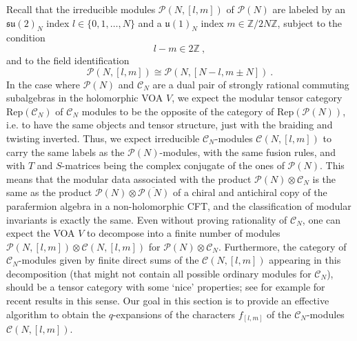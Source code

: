 \documentclass[11pt,reqno]{article}
\newcommand{\be}{\begin{equation}}
\newcommand{\ee}{\end{equation}}
\newcommand{\calC}{\mathcal{C}}
\newcommand{\ZZ}{\mathbb{Z}}
\newcommand{\paraf}{\mathcal{P}}
\newcommand{\alg}[1]{\mathfrak{#1}}
\begin{document}
Recall that the irreducible modules $\paraf(N,[l,m])$ of $\paraf(N)$ are labeled by an $\alg{su}(2)_N$ index $l\in\{0,1,\ldots,N\}$ and a $\alg{u}(1)_N$ index $m\in \ZZ/2N\ZZ$, subject to the condition
\be l-m\in 2\ZZ\ ,
\ee and to the field identification
\be \paraf(N,[l,m])\cong \paraf(N,[N-l,m\pm N])
\ .
\ee In the case where $\paraf(N)$ and $\calC_N$ are a dual pair of strongly rational commuting subalgebras in the holomorphic VOA $V$, we expect the modular tensor category $\mathrm{Rep}(\calC_N)$ of $\calC_N$ modules to be the opposite of the category of $\mathrm{Rep}(\paraf(N))$, i.e. to have the same objects and tensor structure, just with the braiding and twisting inverted. Thus, we expect irreducible $\calC_N$-modules $\calC(N,{[l,m]})$ to carry the same labels as the $\paraf(N)$-modules, with the same fusion rules, and with $T$ and $S$-matrices being the complex conjugate of the ones of $\paraf(N)$. This means that the modular data associated with the product $\paraf(N)\otimes \calC_N$ is the same as the product $\paraf(N)\otimes \overline{\paraf(N)}$ of a chiral and antichiral copy of the parafermion algebra in a non-holomorphic CFT, and the classification of modular invariants is exactly the same. Even without proving rationality of $\calC_N$, one can expect the VOA $V$ to decompose into a finite number of modules $\paraf(N,[l,m])\otimes \calC(N,{[l,m]})$ for $\paraf(N)\otimes \calC_N$. Furthermore, the category of $\calC_N$-modules given by finite direct sums of the $\calC(N,{[l,m]})$ appearing in this decomposition (that might not contain all possible ordinary modules for $\calC_N$), should be a tensor category with some `nice' properties; see for example \cite{McRae2024MirrorEquivalence} for recent results in this sense. Our goal in this section is to provide an effective algorithm to obtain the $q$-expansions of the characters $f_{[l,m]}$ of the $\calC_N$-modules $\calC(N,{[l,m]})$.
\end{document}

